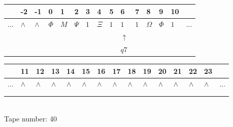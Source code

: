 \documentclass[11pt]{article}
\begin{document}
\begin{table}[H]
\centering
\begin{tabular}{lllllllllllllll}
 & -2 & -1 & 0 & 1 & 2 & 3 & 4 & 5 & 6 & 7 & 8 & 9 & 10 & \\
\hline
$...$ & \multicolumn{1}{|l|}{$\wedge$} & \multicolumn{1}{|l|}{$\wedge$} & \multicolumn{1}{|l|}{$\Phi$} & \multicolumn{1}{|l|}{$M$} & \multicolumn{1}{|l|}{$\Psi$} & \multicolumn{1}{|l|}{$1$} & \multicolumn{1}{|l|}{$\Xi$} & \multicolumn{1}{|l|}{$1$} & \multicolumn{1}{|l|}{$1$} & \multicolumn{1}{|l|}{$1$} & \multicolumn{1}{|l|}{$\Omega$} & \multicolumn{1}{|l|}{$\Phi$} & \multicolumn{1}{|l|}{$1$} & $...$\\
\hline
&  &  &  &  &  &  &  &  & $\uparrow$ &  &  &  &  &  \\
&  &  &  &  &  &  &  &  & $ q7 $ &  &  &  &  &  \\
\end{tabular}
\begin{tabular}{lllllllllllllll}
 & 11 & 12 & 13 & 14 & 15 & 16 & 17 & 18 & 19 & 20 & 21 & 22 & 23 & \\
\hline
$...$ & \multicolumn{1}{|l|}{$\wedge$} & \multicolumn{1}{|l|}{$\wedge$} & \multicolumn{1}{|l|}{$\wedge$} & \multicolumn{1}{|l|}{$\wedge$} & \multicolumn{1}{|l|}{$\wedge$} & \multicolumn{1}{|l|}{$\wedge$} & \multicolumn{1}{|l|}{$\wedge$} & \multicolumn{1}{|l|}{$\wedge$} & \multicolumn{1}{|l|}{$\wedge$} & \multicolumn{1}{|l|}{$\wedge$} & \multicolumn{1}{|l|}{$\wedge$} & \multicolumn{1}{|l|}{$\wedge$} & \multicolumn{1}{|l|}{$\wedge$} & $...$\\
\hline
&  &  &  &  &  &  &  &  &  &  &  &  &  &  \\
&  &  &  &  &  &  &  &  &  &  &  &  &  &  \\
\end{tabular}
\\
Tape number: 40
\noindent\makebox[\linewidth]{\hdashrule{\textwidth}{1pt}{1pt}}\end{table}
\end{document}
